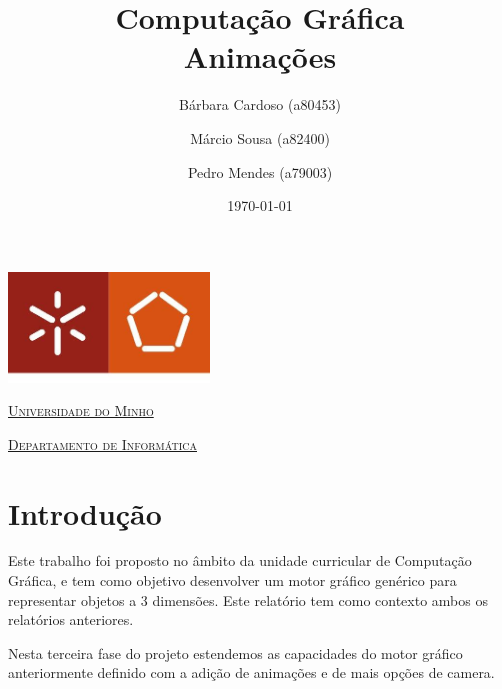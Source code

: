 \documentclass[a4paper]{article}
\begin{document}
\title{Computação Gráfica\\ Animações}
\author{Bárbara Cardoso (a80453) \and Márcio Sousa (a82400) \and Pedro Mendes (a79003)}
\date{\today}

\begin{titlepage}

    \thispagestyle{empty}
    \begin{center}
        \begin{minipage}{0.75\linewidth}
            \centering
            \includegraphics[width=0.4\textwidth]{eng.jpeg}\par\vspace{1cm}
            \vspace{1.5cm}
            \href{https://www.uminho.pt/PT}{\scshape\LARGE Universidade do Minho} \par
            \vspace{1cm}
            \href{https://www.di.uminho.pt/}{\scshape\Large Departamento de Informática} \par
            \vspace{1.5cm}

            \maketitle
        \end{minipage}
    \end{center}

\end{titlepage}

\tableofcontents

\pagebreak

\section{Introdução}
Este trabalho foi proposto no âmbito da unidade curricular de Computação Gráfica, e tem como objetivo desenvolver um motor gráfico genérico para representar objetos a 3 dimensões. Este relatório tem como contexto ambos os relatórios anteriores.

Nesta terceira fase do projeto estendemos as capacidades do motor gráfico anteriormente definido com a adição de animações e de mais opções de camera.
\end{document}
